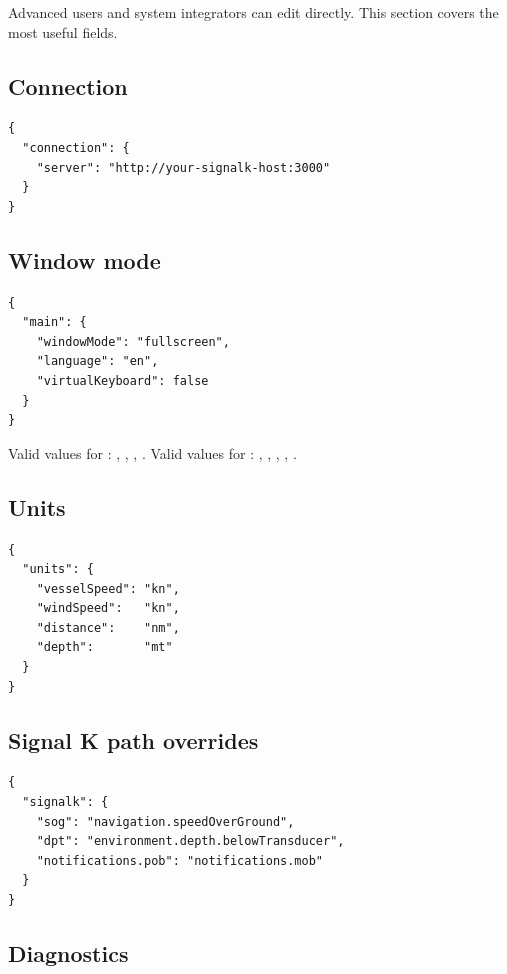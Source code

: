 Advanced users and system integrators can edit 
directly.
This section covers the most useful fields.

\subsection{Connection}

\begin{lstlisting}
{
  "connection": {
    "server": "http://your-signalk-host:3000"
  }
}
\end{lstlisting}

\subsection{Window mode}

\begin{lstlisting}
{
  "main": {
    "windowMode": "fullscreen",
    "language": "en",
    "virtualKeyboard": false
  }
}
\end{lstlisting}

Valid values for : , ,
, .
Valid values for : , , ,
, .

\subsection{Units}

\begin{lstlisting}
{
  "units": {
    "vesselSpeed": "kn",
    "windSpeed":   "kn",
    "distance":    "nm",
    "depth":       "mt"
  }
}
\end{lstlisting}

\subsection{Signal K path overrides}

\begin{lstlisting}
{
  "signalk": {
    "sog": "navigation.speedOverGround",
    "dpt": "environment.depth.belowTransducer",
    "notifications.pob": "notifications.mob"
  }
}
\end{lstlisting}

\subsection{Diagnostics}

